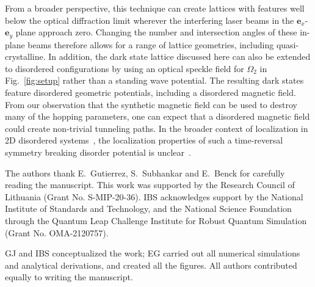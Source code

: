 \documentclass[aps,pra,twocolumn,showpacs,superscriptaddress,floatfix,longbibliography]{revtex4-1}
\def\ex{\boldsymbol{e}_x}
\def\ey{\boldsymbol{e}_y}
\begin{document}
From a broader perspective, this technique can create lattices with features well below the optical diffraction limit wherever the interfering laser beams in the $\ex$-$\ey$ plane approach zero.
Changing the number and intersection angles of these in-plane beams therefore allows for a range of lattice geometries, including quasi-crystalline.
In addition, the dark state lattice discussed here can also be extended to disordered configurations by using an optical speckle field for $\Omega_2$ in Fig.~\ref{fig:setup} rather than a standing wave potential.
The resulting dark states feature disordered geometric potentials, including a disordered magnetic field.
From our observation that the synthetic magnetic field can be used to destroy many of the hopping parameters, one can expect that a disordered magnetic field could create non-trivial tunneling paths.
In the broader context of localization in 2D disordered systems~\cite{Abrahams1979}, the localization properties of such a time-reversal symmetry breaking disorder potential is unclear~\cite{Galitski2005}.

\begin{acknowledgments}

The authors thank E.~Gutierrez, S.~Subhankar and E.~Benck for carefully reading the manuscript.
This work was supported by the Research Council of Lithuania (Grant No. S-MIP-20-36). 
IBS acknowledges support by the National Institute of Standards and Technology, and the National Science Foundation through the Quantum Leap Challenge Institute for Robust Quantum Simulation (Grant No. OMA-2120757).

GJ and IBS conceptualized the work; EG carried out all numerical simulations and analytical derivations, and created all the figures.
All authors contributed equally to writing the manuscript.

\end{acknowledgments} 
\end{document}
